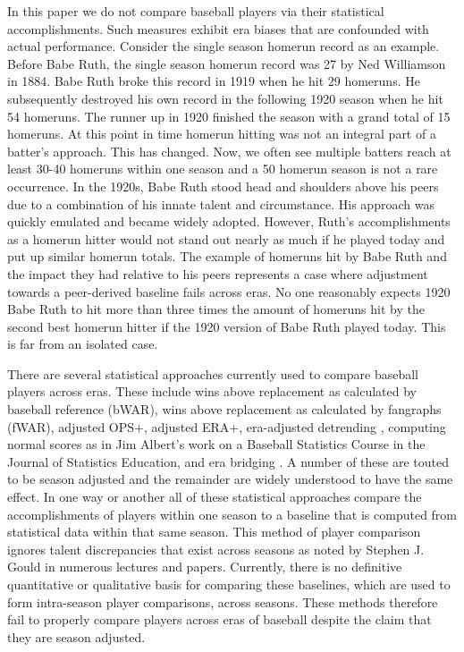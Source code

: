\documentclass[11pt]{article}\usepackage[]{graphicx}\usepackage[]{color}
\begin{document}
In this paper we do not compare baseball players via their statistical 
accomplishments.  Such measures exhibit era biases that are confounded with 
actual performance.  Consider the single season homerun record as an example. 
Before Babe Ruth, the single season homerun record was 27 by Ned Williamson in 
1884. %
Babe Ruth broke this record in 1919 
when he hit 29 homeruns.  He subsequently destroyed his own record in 
the following 1920 season when he hit 54 homeruns.  The runner up in 1920 
finished the season with a grand total of 15 homeruns.  At this point in time 
homerun hitting was not an integral part of a batter's approach. %
This has changed. Now, we often see multiple batters reach at least 30-40 
homeruns within one season and a 50 homerun season is not a rare 
occurrence. %
In the 1920s, Babe Ruth stood head and shoulders above his peers due to a 
combination of his innate talent and circumstance.  
His approach was quickly emulated and became widely adopted. %
However, Ruth's accomplishments as a homerun hitter would not stand out nearly 
as much if he played today and put up similar homerun totals.    
The example of homeruns hit by Babe Ruth and the impact they had relative 
to his peers represents a case where adjustment towards a peer-derived 
baseline fails across eras.  No one reasonably expects 1920 Babe Ruth to hit 
more than three times the amount of homeruns hit by the second best homerun 
hitter if the 1920 version of Babe Ruth played today.  
This is far from an isolated case.  

There are several statistical approaches currently used to compare baseball 
players across eras. 
These include 
wins above replacement as calculated by baseball reference (bWAR), %
wins above replacement as calculated by fangraphs (fWAR), %
adjusted OPS+, %
adjusted ERA+, %
era-adjusted detrending \citep{petersen}, 
computing normal scores as in Jim Albert's work on a Baseball Statistics Course 
in the Journal of Statistics Education, 
and era bridging \citep{berry1999eras}. 
A number of these are touted to be season adjusted and the remainder are 
widely understood to have the same effect.  
In one way or another all of these statistical approaches compare the  
accomplishments of players within one season to a baseline that 
is computed from statistical data within that same season.  
This method of player comparison ignores talent discrepancies that exist across 
seasons as noted by Stephen J. Gould in numerous lectures and papers.
Currently, there is no definitive quantitative or qualitative basis for 
comparing these baselines, which are used to form intra-season player 
comparisons, across seasons.  These methods therefore fail to properly 
compare players across eras of baseball despite the claim that they are 
season adjusted.  
\end{document}

